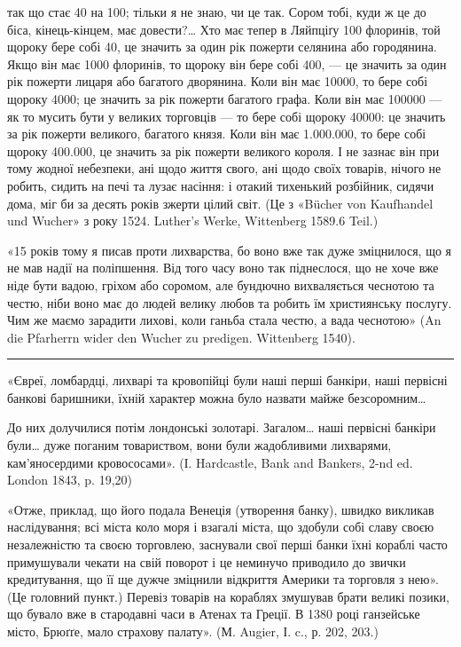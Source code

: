 \parcont{}  %
так що стає 40 на 100; тільки я не знаю, чи це так. Сором тобі, куди ж це
до біса, кінець-кінцем, має довести?\dots{} Хто має тепер в Ляйпціґу 100 флоринів,
той щороку бере собі 40, це значить за один рік пожерти селянина або городянина.
Якщо він має 1000 флоринів, то щороку він бере собі 400, — це значить
за один рік пожерти лицаря або багатого дворянина. Коли він має 10000, то
бере собі щороку 4000; це значить за рік пожерти багатого графа. Коли він
має 100000 — як то мусить бути у великих торговців — то бере собі щороку
40000: це значить за рік пожерти великого, багатого князя. Коли він має
1.000.000, то бере собі щороку 400.000, це значить за рік пожерти великого
короля. І не зазнає він при тому жодної небезпеки, ані щодо життя свого, ані
щодо своїх товарів, нічого не робить, сидить на печі та лузає насіння: і отакий
тихенький розбійник, сидячи дома, міг би за десять років зжерти цілий світ.
(Це з «Bücher von Kaufhandel und Wucher» з року 1524. Luther’s Werke, Wittenberg
1589.6 Teil.)

«15 років тому я писав проти лихварства, бо воно вже так дуже зміцнилося,
що я не мав надії на поліпшення. Від того часу воно так піднеслося, що
не хоче вже ніде бути вадою, гріхом або соромом, але бундючно вихваляється
чеснотою та честю, ніби воно має до людей велику любов та робить їм християнську
послугу. Чим же маємо зарадити лихові, коли ганьба стала честю, а
вада чеснотою» (An die Pfarherrn wider den Wucher zu predigen. Wittenberg 1540).

\pfbreak

«Євреї, ломбардці, лихварі та кровопійці були наші перші банкіри, наші
первісні банкові баришники, їхній характер можна було назвати майже безсоромним\dots{}

До них долучилися потім лондонські золотарі. Загалом\dots{} наші первісні
банкіри були\dots{} дуже поганим товариством, вони були жадобливими лихварями,
кам’яносердими кровососами». (І. Hardcastle, Bank and Bankers, 2-nd ed. London
1843, p. 19,20)

«Отже, приклад, що його подала Венеція (утворення банку), швидко викликав
наслідування; всі міста коло моря і взагалі міста, що здобули собі
славу своєю незалежністю та своєю торговлею, заснували свої перші банки
їхні кораблі часто примушували чекати на свій поворот і це неминучо приводило
до звички кредитування, що її ще дужче зміцнили відкриття Америки та
торговля з нею». (Це головний пункт.) Перевіз товарів на кораблях змушував
брати великі позики, що бувало вже в стародавні часи в Атенах та Греції.
В 1380 році ганзейське місто, Брюґґе, мало страхову палату». (М. Augier, І. c., р.
202, 203.)

